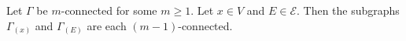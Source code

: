 Let $\Gamma$ be $m$-connected for some $m \geq 1$. Let $x \in V$ and $E \in \mathcal{E}$. Then the subgraphs $\Gamma_{(x)}$ and $\Gamma_{(E)}$ are each $(m - 1)$-connected.
